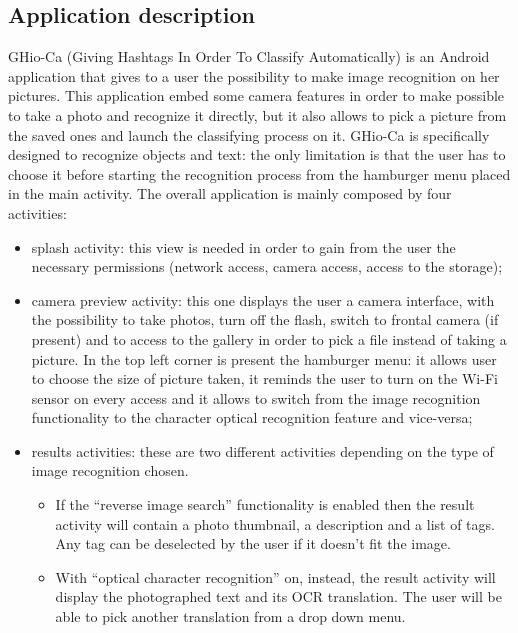 \subsection{Application description}
GHio-Ca (Giving Hashtags In Order To Classify Automatically) is an Android
application that gives to a user the possibility to make image recognition on
her pictures. This application embed some camera features in order to make
possible to take a photo and recognize it directly, but it also allows to pick
a picture from the saved ones and launch the classifying process on it.
GHio-Ca is specifically designed to recognize objects and text: the only
limitation is that the user has to choose it before starting the
recognition process from the hamburger menu placed in the main activity.
The overall application is mainly composed by four activities:
\begin{itemize}
  \item splash activity: this view is needed in order to gain from the user
    the necessary permissions (network access, camera access, access to
    the storage);
  \item camera preview activity: this one displays the user a camera
    interface, with the possibility to take photos, turn off the flash, switch
    to frontal camera (if present) and to access to the gallery in order to
    pick a file instead of taking a picture. In the top left corner is present
    the hamburger menu: it allows user to choose the size of picture taken,
    it reminds the user to turn on the Wi-Fi sensor on every access and it
    allows to switch from the image recognition functionality to the
    character optical recognition feature and vice-versa;
  \item results activities: these are two different activities depending on
    the type of image recognition chosen.
    \begin{itemize}
     \item If the ``reverse image search'' functionality is enabled then the
result activity will contain a photo thumbnail, a description and a list of
tags. Any tag can be deselected by the user if it doesn't fit the image.
     \item With ``optical character recognition'' on, instead, the result
activity will display the photographed text and its OCR translation. The user
will be able to pick another translation from a drop down menu.
    \end{itemize}
\end{itemize}
